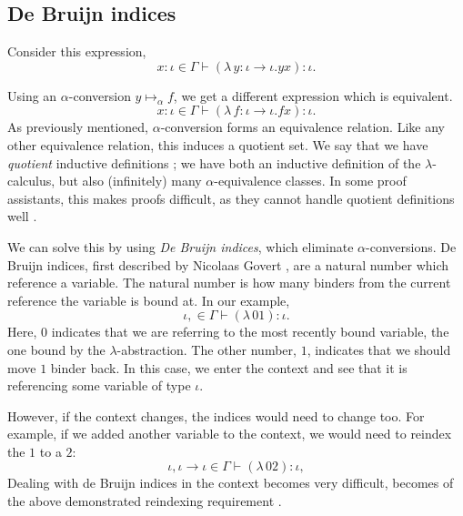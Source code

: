 \subsection{De Bruijn indices}
\label{section:background_debruijn}
Consider this expression,
\begin{equation*}
  x \colon \iota \in \Gamma \vdash (\lambda \, y \colon \iota \to \iota. y x) \colon \iota.
\end{equation*}

Using an $\alpha$-conversion $y \mapsto_{\alpha} f$, we get a different expression which is
equivalent.
\begin{equation*}
  x \colon \iota \in \Gamma \vdash (\lambda \, f \colon \iota \to \iota. f x) \colon \iota.
\end{equation*}
As previously mentioned, $\alpha$-conversion forms an equivalence relation. Like any other equivalence
relation, this induces a quotient set. We say that we have \textit{quotient} inductive definitions
\citep{aydemir_engineering_2008}; we have both an inductive definition of the $\lambda$-calculus,
but also (infinitely) many $\alpha$-equivalence classes. In some proof assistants, this makes proofs
difficult, as they cannot handle quotient definitions well \citep{pitts_locally_2023}.

We can solve this by using \textit{De Bruijn indices}, which eliminate $\alpha$-conversions. De Bruijn
indices, first described by Nicolaas Govert \citet{de_bruijn_lambda_1972}, are a natural number
which reference a variable. The natural number is how many binders from the current reference the
variable is bound at. In our example,
\begin{equation*}
  \iota, \in \Gamma \vdash (\lambda \, 0 1) \colon \iota.
\end{equation*}
Here, $0$ indicates that we are referring to the most recently bound variable, the one bound by the
$\lambda$-abstraction. The other number, $1$, indicates that we should move $1$ binder back. In this
case, we enter the context and see that it is referencing some variable of type $\iota$.

However, if the context changes, the indices would need to change too. For example, if we added
another variable to the context, we would need to reindex the $1$ to a $2$:
\begin{equation*}
  \iota, \iota \to \iota \in \Gamma \vdash (\lambda \, 0 2) \colon \iota,
\end{equation*}
Dealing with de Bruijn indices in the context becomes very difficult, becomes of the above
demonstrated reindexing requirement \citep[section~2.1]{aydemir_engineering_2008}.

